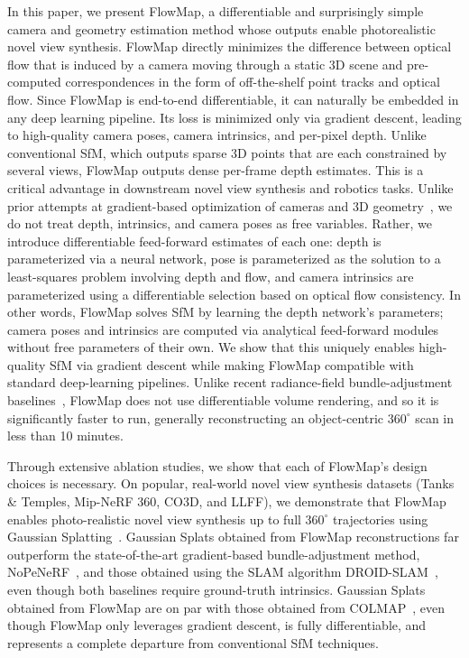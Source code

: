 
In this paper, we present FlowMap, a differentiable and surprisingly simple camera and geometry estimation method whose outputs enable photorealistic novel view synthesis. 
FlowMap directly minimizes the difference between optical flow that is induced by a camera moving through a static 3D scene and pre-computed correspondences in the form of off-the-shelf point tracks and optical flow.
Since FlowMap is end-to-end differentiable, it can naturally be embedded in any deep learning pipeline.
Its loss is minimized only via gradient descent, leading to high-quality camera poses, camera intrinsics, and per-pixel depth.
Unlike conventional SfM, which outputs sparse 3D points that are each constrained by several views, FlowMap outputs dense per-frame depth estimates.
This is a critical advantage in downstream novel view synthesis and robotics tasks.
Unlike prior attempts at gradient-based optimization of cameras and 3D geometry~\cite{lin2021barf,nerf--,bian2022nopenerf}, we do not treat depth, intrinsics, and camera poses as free variables.
Rather, we introduce differentiable feed-forward estimates of each one: depth is parameterized via a neural network, pose is parameterized as the solution to a least-squares problem involving depth and flow, and camera intrinsics are parameterized using a differentiable selection based on optical flow consistency.
In other words, FlowMap solves SfM by learning the depth network's parameters; camera poses and intrinsics are computed via analytical feed-forward modules without free parameters of their own.
We show that this uniquely enables high-quality SfM via gradient descent while making FlowMap compatible with standard deep-learning pipelines.
Unlike recent radiance-field bundle-adjustment baselines~\cite{bian2022nopenerf,lin2021barf}, FlowMap does not use differentiable volume rendering, and so it is significantly faster to run, generally reconstructing an object-centric $360^\circ$ scan in less than 10 minutes.

Through extensive ablation studies, we show that each of FlowMap's design choices is necessary.
On popular, real-world novel view synthesis datasets (Tanks \& Temples, Mip-NeRF 360, CO3D, and LLFF), we demonstrate that FlowMap enables photo-realistic novel view synthesis up to full $360^\circ$ trajectories using Gaussian Splatting~\cite{kerbl20233d}. 
Gaussian Splats obtained from FlowMap reconstructions far outperform the state-of-the-art gradient-based bundle-adjustment method, NoPeNeRF~\cite{bian2022nopenerf}, and those obtained using the SLAM algorithm DROID-SLAM~\cite{teed2021droid}, even though both baselines require ground-truth intrinsics.
Gaussian Splats obtained from FlowMap are on par with those obtained from COLMAP~\cite{schonberger2016structure}, even though FlowMap only leverages gradient descent, is fully differentiable, and represents a complete departure from conventional SfM techniques.
